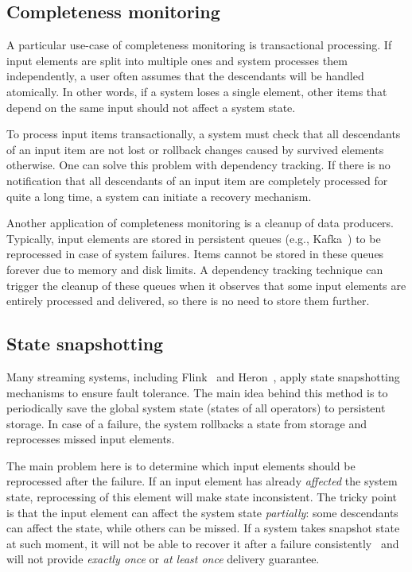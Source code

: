 \subsection{Completeness monitoring}

A particular use-case of completeness monitoring is transactional processing. If input elements are split into multiple ones and system processes them independently, a user often assumes that the descendants will be handled atomically. In other words, if a system loses a single element, other items that depend on the same input should not affect a system state. 

To process input items transactionally, a system must check that all descendants of an input item are not lost or rollback changes caused by survived elements otherwise. One can solve this problem with dependency tracking. If there is no notification that all descendants of an input item are completely processed for quite a long time, a system can initiate a recovery mechanism.

Another application of completeness monitoring is a cleanup of data producers. Typically, input elements are stored in persistent queues (e.g., Kafka~\cite{kreps2011kafka}) to be reprocessed in case of system failures. Items cannot be stored in these queues forever due to memory and disk limits. A dependency tracking technique can trigger the cleanup of these queues when it observes that some input elements are entirely processed and delivered, so there is no need to store them further.

\subsection{State snapshotting}
Many streaming systems, including Flink~\cite{Carbone:2017:SMA:3137765.3137777} and Heron~\cite{Kulkarni:2015:THS:2723372.2742788}, apply state snapshotting mechanisms to ensure fault tolerance. The main idea behind this method is to periodically save the global system state (states of all operators) to persistent storage. In case of a failure, the system rollbacks a state from storage and reprocesses missed input elements. 

The main problem here is to determine which input elements should be reprocessed after the failure. If an input element has already {\em affected} the system state, reprocessing of this element will make state inconsistent. The tricky point is that the input element can affect the system state {\em partially}: some descendants can affect the state, while others can be missed. If a system takes snapshot state at such moment, it will not be able to recover it after a failure consistently~\cite{2015arXiv150608603C} and will not provide {\em exactly once} or {\em at least once} delivery guarantee.

